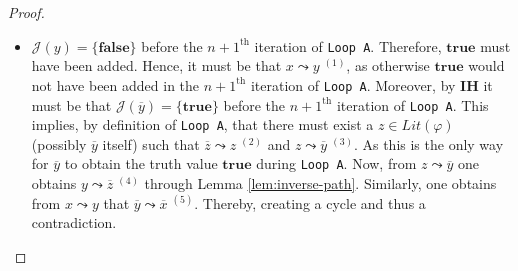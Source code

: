 \documentclass [11pt]{article}
\newcommand{\True}{\mathbf{true}}
\newcommand{\False}{\mathbf{false}}
\newcommand{\lit}{\mathit{Lit}}
\newcommand{\reach}{\leadsto}
\begin{document}
\begin{proof}
\begin{itemize}
\begin{itemize}
\begin{center}
\end{center}
 
 
 
\item $\mathcal{J}(y)=\{\False\}$ before the $n+1^{\text{th}}$ iteration of \texttt{Loop A}. Therefore, $\True$ must have been added. Hence, it must be that $x \reach y\;^{(1)}$, as otherwise $\True$ would not have been added in the $n+1^{\text{th}}$ iteration of \texttt{Loop A}. Moreover, by \textbf{IH} it must be that $\mathcal{J}(\overline{y})=\{\True\}$ before the $n+1^{\text{th}}$ iteration of \texttt{Loop A}. This implies, by definition of \texttt{Loop A}, that there must exist a $z \in \lit(\varphi)$  (possibly $\overline{y}$ itself) such that 
$\overline{z} \reach z\; ^{(2)}$ and $z \reach \overline{y}\; ^{(3)}$. As this is the only way for $\overline{y}$ to obtain the truth value $\True$ during \texttt{Loop A}. Now, from $z \reach \overline{y}$ one obtains $y \reach \overline{z}\;^{(4)}$ 
through Lemma \ref{lem:inverse-path}. Similarly, one obtains from $x \reach y$ that $\overline{y} \reach \overline{x}\;^{(5)}$. Thereby, creating a cycle and thus a contradiction.

\begin{center}
\end{center}
\end{itemize}
\end{itemize}
\end{proof}
\end{document}
